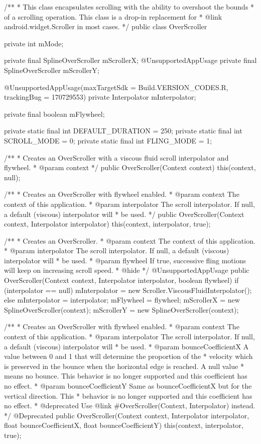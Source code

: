 /**
 * This class encapsulates scrolling with the ability to overshoot the bounds
 * of a scrolling operation. This class is a drop-in replacement for
 * {@link android.widget.Scroller} in most cases.
 */
public class OverScroller {
    private int mMode;

    private final SplineOverScroller mScrollerX;
    @UnsupportedAppUsage
    private final SplineOverScroller mScrollerY;

    @UnsupportedAppUsage(maxTargetSdk = Build.VERSION_CODES.R, trackingBug = 170729553)
    private Interpolator mInterpolator;

    private final boolean mFlywheel;

    private static final int DEFAULT_DURATION = 250;
    private static final int SCROLL_MODE = 0;
    private static final int FLING_MODE = 1;

    /**
     * Creates an OverScroller with a viscous fluid scroll interpolator and flywheel.
     * @param context
     */
    public OverScroller(Context context) {
        this(context, null);
    }

    /**
     * Creates an OverScroller with flywheel enabled.
     * @param context The context of this application.
     * @param interpolator The scroll interpolator. If null, a default (viscous) interpolator will
     * be used.
     */
    public OverScroller(Context context, Interpolator interpolator) {
        this(context, interpolator, true);
    }

    /**
     * Creates an OverScroller.
     * @param context The context of this application.
     * @param interpolator The scroll interpolator. If null, a default (viscous) interpolator will
     * be used.
     * @param flywheel If true, successive fling motions will keep on increasing scroll speed.
     * @hide
     */
    @UnsupportedAppUsage
    public OverScroller(Context context, Interpolator interpolator, boolean flywheel) {
        if (interpolator == null) {
            mInterpolator = new Scroller.ViscousFluidInterpolator();
        } else {
            mInterpolator = interpolator;
        }
        mFlywheel = flywheel;
        mScrollerX = new SplineOverScroller(context);
        mScrollerY = new SplineOverScroller(context);
    }

    /**
     * Creates an OverScroller with flywheel enabled.
     * @param context The context of this application.
     * @param interpolator The scroll interpolator. If null, a default (viscous) interpolator will
     * be used.
     * @param bounceCoefficientX A value between 0 and 1 that will determine the proportion of the
     * velocity which is preserved in the bounce when the horizontal edge is reached. A null value
     * means no bounce. This behavior is no longer supported and this coefficient has no effect.
     * @param bounceCoefficientY Same as bounceCoefficientX but for the vertical direction. This
     * behavior is no longer supported and this coefficient has no effect.
     * @deprecated Use {@link #OverScroller(Context, Interpolator)} instead.
     */
    @Deprecated
    public OverScroller(Context context, Interpolator interpolator,
            float bounceCoefficientX, float bounceCoefficientY) {
        this(context, interpolator, true);
    }

}
